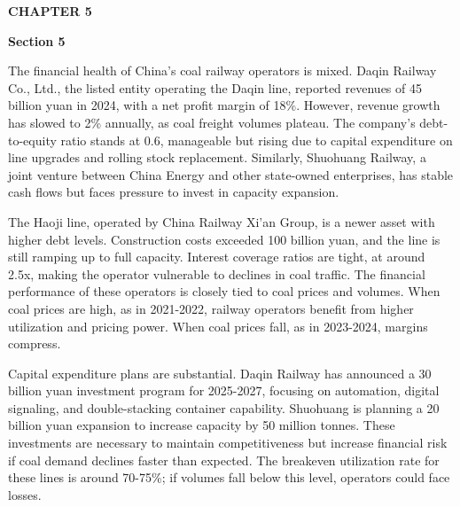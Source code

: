 \documentclass[10pt,a4paper]{article}
\begin{document}
\clearpage
{\textcolor{BOBlue}{\scriptsize\bfseries CHAPTER 5}}\par\vspace{-1pt}
{\Large\sffamily\bfseries\color{BONavy} Section 5}\par\vspace{4pt}
{\small The financial health of China's coal railway operators is mixed. Daqin Railway Co., Ltd., the listed entity operating the Daqin line, reported revenues of 45 billion yuan in 2024, with a net profit margin of 18\%. However, revenue growth has slowed to 2\% annually, as coal freight volumes plateau. The company's debt-to-equity ratio stands at 0.6, manageable but rising due to capital expenditure on line upgrades and rolling stock replacement. Similarly, Shuohuang Railway, a joint venture between China Energy and other state-owned enterprises, has stable cash flows but faces pressure to invest in capacity expansion.}

{\small The Haoji line, operated by China Railway Xi'an Group, is a newer asset with higher debt levels. Construction costs exceeded 100 billion yuan, and the line is still ramping up to full capacity. Interest coverage ratios are tight, at around 2.5x, making the operator vulnerable to declines in coal traffic. The financial performance of these operators is closely tied to coal prices and volumes. When coal prices are high, as in 2021-2022, railway operators benefit from higher utilization and pricing power. When coal prices fall, as in 2023-2024, margins compress.}

{\small Capital expenditure plans are substantial. Daqin Railway has announced a 30 billion yuan investment program for 2025-2027, focusing on automation, digital signaling, and double-stacking container capability. Shuohuang is planning a 20 billion yuan expansion to increase capacity by 50 million tonnes. These investments are necessary to maintain competitiveness but increase financial risk if coal demand declines faster than expected. The breakeven utilization rate for these lines is around 70-75\%; if volumes fall below this level, operators could face losses.}
\vspace{3pt}\noindent{}\vspace{4pt}
\end{document}
